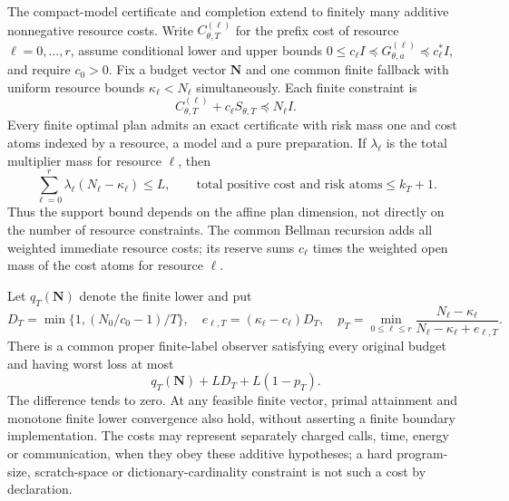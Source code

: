 \begin{theorem}\label{thm:multi-resource}
The compact-model certificate and completion extend to finitely many additive nonnegative resource costs. Write $C_{\theta,T}^{(\ell)}$ for the prefix cost of resource $\ell=0,\ldots,r$, assume conditional lower and upper bounds $0\le c_\ell I\preccurlyeq G_{\theta,a}^{(\ell)}\preccurlyeq c_\ell^*I$, and require $c_0>0$. Fix a budget vector $\mathbf N$ and one common finite fallback with uniform resource bounds $\kappa_\ell<N_\ell$ simultaneously. Each finite constraint is
\[
 C_{\theta,T}^{(\ell)}+c_\ell S_{\theta,T}
                         \preccurlyeq N_\ell I.
\]
Every finite optimal plan admits an exact certificate with risk mass one and cost atoms indexed by a resource, a model and a pure preparation. If $\lambda_\ell$ is the total multiplier mass for resource $\ell$, then
\[
 \sum_{\ell=0}^r\lambda_\ell(N_\ell-\kappa_\ell)\le L,
 \qquad \text{total positive cost and risk atoms}\le k_T+1.
\]
Thus the support bound depends on the affine plan dimension, not directly on the number of resource constraints. The common Bellman recursion adds all weighted immediate resource costs; its reserve sums $c_\ell$ times the weighted open mass of the cost atoms for resource $\ell$.

Let $q_T(\mathbf N)$ denote the finite lower and put
\[
 D_T=\min\{1,(N_0/c_0-1)/T\},\quad
 e_{\ell,T}=(\kappa_\ell-c_\ell)D_T,\quad
 p_T=\min_{0\le\ell\le r}
 \frac{N_\ell-\kappa_\ell}{N_\ell-\kappa_\ell+e_{\ell,T}}.
\]
There is a common proper finite-label observer satisfying every original budget and having worst loss at most
\[
 q_T(\mathbf N)+LD_T+L(1-p_T).
\]
The difference tends to zero. At any feasible finite vector, primal attainment and monotone finite lower convergence also hold, without asserting a finite boundary implementation. The costs may represent separately charged calls, time, energy or communication, when they obey these additive hypotheses; a hard program-size, scratch-space or dictionary-cardinality constraint is not such a cost by declaration.
\end{theorem}
